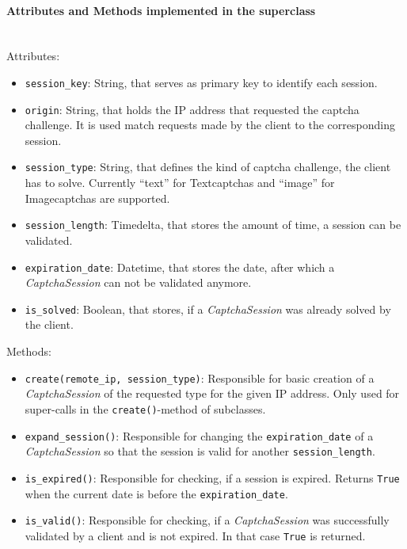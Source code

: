 \paragraph{Attributes and Methods implemented in the superclass} \mbox{} \\


Attributes:

\begin{itemize}
\item \verb|session_key|: String, that serves as primary key to identify each session. 
\item \verb|origin|: String, that holds the IP address that requested the captcha challenge. It is used match requests made by the client to the corresponding session.
\item \verb|session_type|: String, that defines the kind of captcha challenge, the client has to solve. Currently ``text'' for Textcaptchas and ``image'' for Imagecaptchas are supported.
\item \verb|session_length|: Timedelta, that stores the amount of time, a session can be validated.
\item \verb|expiration_date|: Datetime, that stores the date, after which a \emph{CaptchaSession} can not be validated anymore.
\item \verb|is_solved|: Boolean, that stores, if a \emph{CaptchaSession} was already solved by the client.
\end{itemize}


Methods:

\begin{itemize} 
\item \verb|create(remote_ip, session_type)|: Responsible for basic creation of a \emph{CaptchaSession} of the requested type for the given IP address. Only used for super-calls in the \verb|create()|-method of subclasses.
\item \verb|expand_session()|: Responsible for changing the \verb|expiration_date| of a \emph{CaptchaSession} so that the session is valid for another \verb|session_length|.
\item \verb|is_expired()|: Responsible for checking, if a session is expired. Returns \verb|True| when the current date is before the \verb|expiration_date|.
\item \verb|is_valid()|: Responsible for checking, if a \emph{CaptchaSession} was successfully validated by a client and is not expired. In that case \verb|True| is returned.
\end{itemize}


